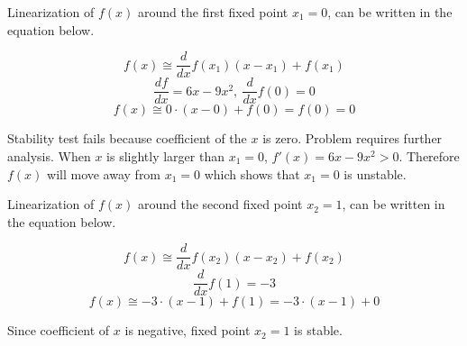 \documentclass[12pt,a4paper, margin=1in]{article}
\begin{document}
\begin{enumerate}[label=\textbf{\arabic*.}]
        Linearization of $f(x)$ around the first fixed point $x_1 = 0$, can be written in the equation below.

        \begin{equation*}
            f(x) \cong \frac{d}{dx}f(x_1)(x-x_1) + f(x_1)
        \end{equation*}
        \begin{equation*}
            \frac{df}{dx} = 6x - 9x^2, \ \frac{d}{dx}f(0) = 0
        \end{equation*}
        \begin{equation*}
            f(x) \cong 0\cdot(x-0) + f(0) = f(0) = 0
        \end{equation*}

        Stability test fails because coefficient of the $x$ is zero. Problem requires further analysis.
        When $x$ is slightly larger than $x_1 = 0$, $f'(x) = 6x-9x^2 > 0$. Therefore $f(x)$ will move away from $x_1=0$
        which shows that $x_1=0$ is unstable.

        Linearization of $f(x)$ around the second fixed point $x_2 = 1$, can be written in the equation below.

        \begin{equation*}
            f(x) \cong \frac{d}{dx}f(x_2)(x-x_2) + f(x_2)
        \end{equation*}
        \begin{equation*}
            \frac{d}{dx}f(1) = -3
        \end{equation*}
        \begin{equation*}
            f(x) \cong -3\cdot(x-1) + f(1) = -3\cdot(x-1) + 0
        \end{equation*}

        Since coefficient of $x$ is negative, fixed point $x_2 = 1$ is stable.
\end{enumerate}
\end{document}
